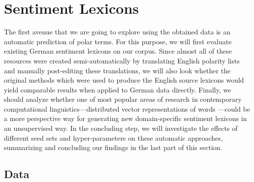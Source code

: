

\chapter{Sentiment Lexicons}\label{sec:snt:lex}

The first avenue that we are going to explore using the obtained data
is an automatic prediction of polar terms.
For this purpose, we will first evaluate existing German sentiment
lexicons on our corpus.  Since almost all of these resources were
created semi-automatically by translating English polarity lists and
manually post-editing these translations, we will also look whether
the original methods which were used to produce the English source
lexicons would yield comparable results when applied to German data
directly.  Finally, we should analyze whether one of most popular
areas of research in contemporary computational
linguistics---distributed vector representations of words
\cite{Mikolov:13}---could be a more perspective way for generating new
domain-specific sentiment lexicons in an unsupervised way.  In the
concluding step, we will investigate the effects of different seed
sets and hyper-parameters on these automatic approaches, summarizing
and concluding our findings in the last part of this section.

\section{Data}\label{subsec:snt-lex:data}


